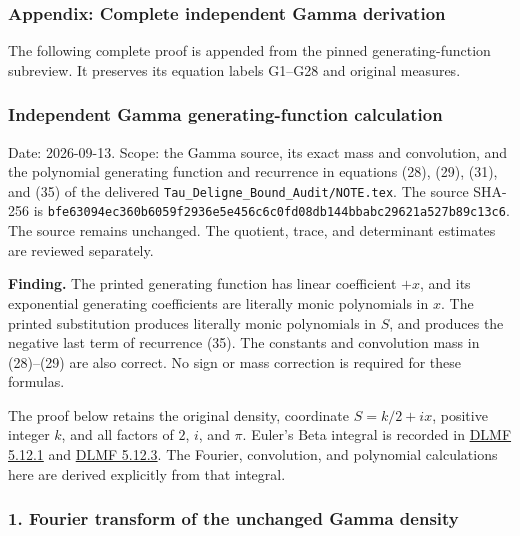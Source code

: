 \subsubsection{Appendix: Complete independent Gamma derivation}\label{GraphV2:endpoint-gamma_review--appendix-complete-independent-gamma-derivation}

The following complete proof is appended from the pinned generating-function subreview. It preserves its equation labels G1--G28 and original measures.

\subsubsection{Independent Gamma generating-function calculation}\label{GraphV2:endpoint-gamma_review--independent-gamma-generating-function-calculation}

Date: 2026-09-13. Scope: the Gamma source, its exact mass and convolution, and the polynomial generating function and recurrence in equations (28), (29), (31), and (35) of the delivered \nolinkurl{Tau_Deligne_Bound_Audit/NOTE.tex}. The source SHA-256 is \nolinkurl{bfe63094ec360b6059f2936e5e456c6c0fd08db144bbabc29621a527b89c13c6}. The source remains unchanged. The quotient, trace, and determinant estimates are reviewed separately.

\textbf{Finding.} The printed generating function has linear coefficient \(+x\), and its exponential generating coefficients are literally monic polynomials in \(x\). The printed substitution produces literally monic polynomials in \(S\), and produces the negative last term of recurrence (35). The constants and convolution mass in (28)--(29) are also correct. No sign or mass correction is required for these formulas.

The proof below retains the original density, coordinate \(S=k/2+ix\), positive integer \(k\), and all factors of \(2\), \(i\), and \(\pi\). Euler's Beta integral is recorded in \href{https://dlmf.nist.gov/5.12.E1}{DLMF 5.12.1} and \href{https://dlmf.nist.gov/5.12.E3}{DLMF 5.12.3}. The Fourier, convolution, and polynomial calculations here are derived explicitly from that integral.

\subsubsection{1. Fourier transform of the unchanged Gamma density}\label{GraphV2:endpoint-gamma_review--fourier-transform-of-the-unchanged-gamma-density}

